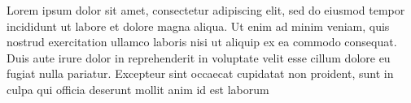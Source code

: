 \documentclass[../template/template.tex]{subfiles}
\begin{document}
    Lorem ipsum dolor sit amet, consectetur adipiscing elit, sed do eiusmod tempor incididunt ut labore et dolore magna aliqua. Ut enim ad minim veniam, quis nostrud exercitation ullamco laboris nisi ut aliquip ex ea commodo consequat. Duis aute irure dolor in reprehenderit in voluptate velit esse cillum dolore eu fugiat nulla pariatur. Excepteur sint occaecat cupidatat non proident, sunt in culpa qui officia deserunt mollit anim id est laborum
\end{document}
